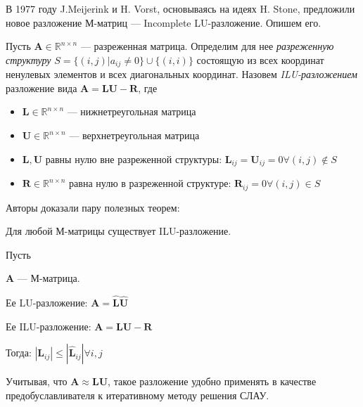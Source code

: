 \documentclass[14pt, a4paper]{extreport}
\begin{document}
В 1977 году J.Meijerink и H. Vorst, основываясь на идеях H. Stone\cite{proto_ilu}, предложили новое разложение М-матриц --- Incomplete LU-разложение\cite{ilu}. Опишем его.

Пусть $\mathbf{A} \in \mathbb{R}^{n \times n}$ --- разреженная матрица. Определим для нее \emph{разреженную структуру} $S = \{(i, j) | a_{ij} \neq 0\} \cup \{(i,i)\}$ состоящую из всех координат ненулевых элементов и всех диагональных координат. Назовем \emph{ILU-разложением} разложение вида $\mathbf{A} = \mathbf{L}\mathbf{U} - \mathbf{R}$, где
\begin{itemize}
	\item $\mathbf{L} \in \mathbb{R}^{n \times n}$ --- нижнетреугольная матрица
	\item $\mathbf{U} \in \mathbb{R}^{n \times n}$ --- верхнетреугольная матрица
	\item $\mathbf{L}, \mathbf{U}$ равны нулю вне разреженной структуры: $\mathbf{L}_{ij} = \mathbf{U}_{ij} = 0 \forall (i, j) \notin S$
	\item $\mathbf{R} \in \mathbb{R}^{n \times n}$ равна нулю в разреженной структуре: $\mathbf{R}_{ij} = 0 \forall (i, j) \in S$
\end{itemize}

Авторы доказали пару полезных теорем:
\begin{theorem}[Существование]
	Для любой М-матрицы существует ILU-разложение.
\end{theorem}
\begin{theorem}[Устойчивость]
	Пусть 
	
	$\mathbf{A}$ --- М-матрица. 
	
	Ее LU-разложение: $\mathbf{A} = \hat{\mathbf{L}}\hat{\mathbf{U}}$ 
	
	Ее ILU-разложение: $\mathbf{A} = \mathbf{LU} - \mathbf{R}$
	
	Тогда: $|\mathbf{L}_{ij}| \leq |\hat{\mathbf{L}}_{ij}| \forall i,j$
\end{theorem}

Учитывая, что $\mathbf{A} \approx \mathbf{LU}$, такое разложение удобно применять в качестве предобуславливателя к итеративному методу решения СЛАУ.

\clearpage
\end{document}
